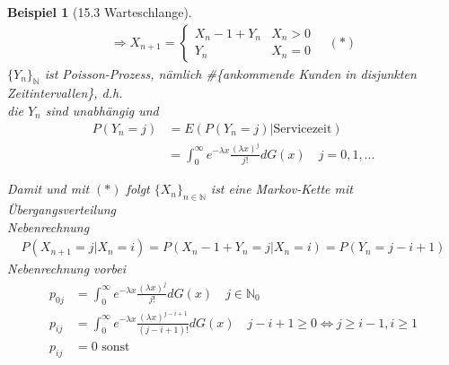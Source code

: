 \documentclass[a4paper,openany]{book}
\theoremstyle{mytheoremstyle}
\newtheorem*{bei}{Beispiel}
\theoremstyle{mytheoremstyle2}
\begin{document}
\begin{bei}[15.3 Warteschlange]
  \begin{align*}
    \Rightarrow X _{n+1}=\begin{cases}
       X _{n}-1+Y_n&X_n>0\\
       Y_n&X_n=0
    \end{cases}\quad(*)
  \end{align*}
  $\{Y_n\}_{\mathbb{N}} $ ist Poisson-Prozess, nämlich \#\{ankommende Kunden in disjunkten Zeitintervallen\}, d.h. \\
  die $Y_n$ sind unabhängig und
  \begin{align*}
    P(Y_n=j)&=E(P(Y_n=j)|\text{Servicezeit})\\
            &=\int_{0}^{\infty }{e^{-\lambda x}\frac{(\lambda x)^j}{j!}dG(x)}\quad j=0,1,...
  \end{align*}
  \begin{center}
  \end{center}
  Damit und mit $(*)$ folgt $\{X_n\}_{n \in \mathbb{N}}$ ist eine Markov-Kette mit Übergangsverteilung \\
  Nebenrechnung
  \begin{align*}
    P(X _{n+1}=j|X_n=i)=P(X _{n}-1+Y_n=j|X_n=i)=P(Y_n=j-i+1)
  \end{align*}
  Nebenrechnung vorbei
  \begin{align*}
    p _{0j}&=\int_{0}^{\infty }{e^{-\lambda x}\frac{(\lambda x)^j}{j!}dG(x)}\quad j \in \mathbb{N}_0\\
    p _{ij}&=\int_{0}^{\infty }{e^{-\lambda x}\frac{(\lambda x)^{j-i+1}}{(j-i+1)!}dG(x)}\quad j-i+1 \geq 0 \Leftrightarrow j \geq i-1, i \geq 1 \\
    p _{ij}&=0 \text{ sonst}
  \end{align*}
\end{bei}
\end{document}
